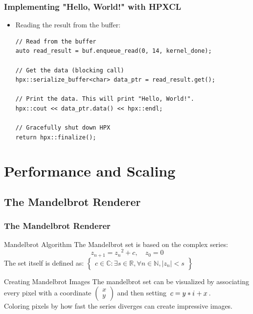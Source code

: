 \documentclass{beamer}
\begin{document}
\begin{frame}[fragile]
    \frametitle{Implementing "Hello, World!" with HPXCL}
    \begin{itemize}
        \item Reading the result from the buffer:
        \begin{lstlisting}[firstnumber=81]
// Read from the buffer
auto read_result = buf.enqueue_read(0, 14, kernel_done);

// Get the data (blocking call)
hpx::serialize_buffer<char> data_ptr = read_result.get();

// Print the data. This will print "Hello, World!".
hpx::cout << data_ptr.data() << hpx::endl;

// Gracefully shut down HPX
return hpx::finalize();
        \end{lstlisting}
    \end{itemize}
\end{frame}



\section{Performance and Scaling}

\newcommand{\iu}{{\mathnormal{i}\mkern1mu}}
\subsection{The Mandelbrot Renderer} %
\begin{frame}
    \frametitle{The Mandelbrot Renderer}
    \begin{block}{Mandelbrot Algorithm}
        The Mandelbrot set is based on the complex series:\\
        $$z_{n+1} = {z_n}^2 + c, \quad  z_0 = 0$$
    The set itself is defined as:
    $\begin{Bmatrix}c \in \mathbb{C}: \exists s \in \mathbb{R}, \forall n \in \mathbb{N},
                    |z_n| < s\end{Bmatrix}$\\
    \end{block}
    \begin{block}{Creating Mandelbrot Images}
        The mandelbrot set can be visualized by associating every pixel with
        a coordinate $\begin{pmatrix}x\\y\end{pmatrix}$ and then setting 
        $\,c = y * \iu + x\,$.
        \\
        Coloring pixels by how fast the series diverges can create
        impressive images.
    \end{block}
\end{frame}
\end{document}
